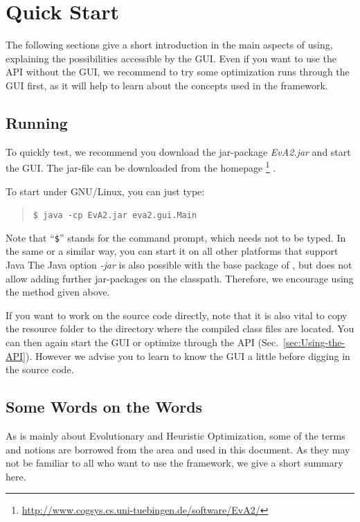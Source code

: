 \chapter{Quick Start\label{sec:Quick-Start}}

The following sections give a short introduction in the main aspects
of using, explaining the possibilities accessible by the
GUI. Even if you want to use the API without the GUI, we recommend
to try some optimization runs through the GUI first, as it will help
to learn about the concepts used in the framework.


\section{Running \label{sub:Quickly-Running-JavaEvA}}

To quickly test, we recommend you download the jar-package
\emph{EvA2.jar} and start the GUI. The jar-file can be downloaded
from the  homepage%
\footnote{\url{http://www.cogsys.cs.uni-tuebingen.de/software/EvA2/}%
} \cite{EvA2HomePage}.

To start under GNU/Linux, you can just type:
\begin{quotation}
\texttt{\small \$ java -cp EvA2.jar eva2.gui.Main}{\small \par}
\end{quotation}
Note that ``\texttt{\$}'' stands for the command prompt, which needs
not to be typed. In the same or a similar way, you can start it on
all other platforms that support Java The Java option \emph{-jar}
is also possible with the base package of , but does not allow adding
further jar-packages on the classpath. Therefore, we encourage using
the method given above.

If you want to work on the source code directly, note that it is also
vital to copy the resource folder to the directory where the compiled
class files are located. You can then again start the GUI or optimize
through the API (Sec.~\ref{sec:Using-the-API}). However we advise
you to learn to know the GUI a little before digging in the source
code.


\section{Some Words on the Words}

As  is mainly about Evolutionary and Heuristic Optimization,
some of the terms and notions are borrowed from the area and used
in this document. As they may not be familiar to all who want to use
the framework, we give a short summary here.

